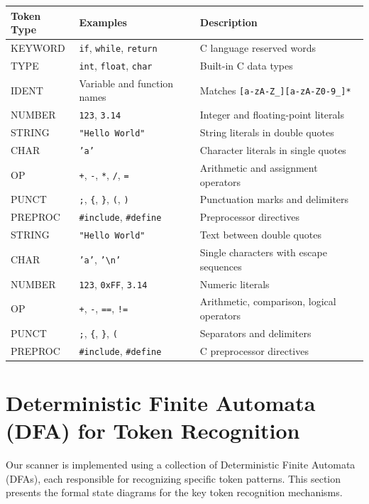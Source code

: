 \documentclass[12pt]{article}
\begin{document}
\begin{center}
\begin{tabular}{|l|l|l|}
\hline
\textbf{Token Type} & \textbf{Examples} & \textbf{Description} \\
\hline
KEYWORD & \texttt{if}, \texttt{while}, \texttt{return} & C language reserved words \\
\hline
TYPE & \texttt{int}, \texttt{float}, \texttt{char} & Built-in C data types \\
\hline
IDENT & Variable and function names & Matches \texttt{[a-zA-Z\_][a-zA-Z0-9\_]*} \\
\hline
NUMBER & \texttt{123}, \texttt{3.14} & Integer and floating-point literals \\
\hline
STRING & \texttt{"Hello World"} & String literals in double quotes \\
\hline
CHAR & \texttt{'a'} & Character literals in single quotes \\
\hline
OP & \texttt{+}, \texttt{-}, \texttt{*}, \texttt{/}, \texttt{=} & Arithmetic and assignment operators \\
\hline
PUNCT & \texttt{;}, \texttt{\{}, \texttt{\}}, \texttt{(}, \texttt{)} & Punctuation marks and delimiters \\
\hline
PREPROC & \texttt{\#include}, \texttt{\#define} & Preprocessor directives \\
\hline
STRING & \texttt{"Hello World"} & Text between double quotes \\
\hline
CHAR & \texttt{'a'}, \texttt{'\textbackslash n'} & Single characters with escape sequences \\
\hline
NUMBER & \texttt{123}, \texttt{0xFF}, \texttt{3.14} & Numeric literals \\
\hline
OP & \texttt{+}, \texttt{-}, \texttt{==}, \texttt{!=} & Arithmetic, comparison, logical operators \\
\hline
PUNCT & \texttt{;}, \texttt{\{}, \texttt{\}}, \texttt{(} & Separators and delimiters \\
\hline
PREPROC & \texttt{\#include}, \texttt{\#define} & C preprocessor directives \\
\hline
\end{tabular}
\end{center}
\section{Deterministic Finite Automata (DFA) for Token Recognition}

Our scanner is implemented using a collection of Deterministic Finite Automata (DFAs), each responsible for recognizing specific token patterns. This section presents the formal state diagrams for the key token recognition mechanisms.
\end{document}
